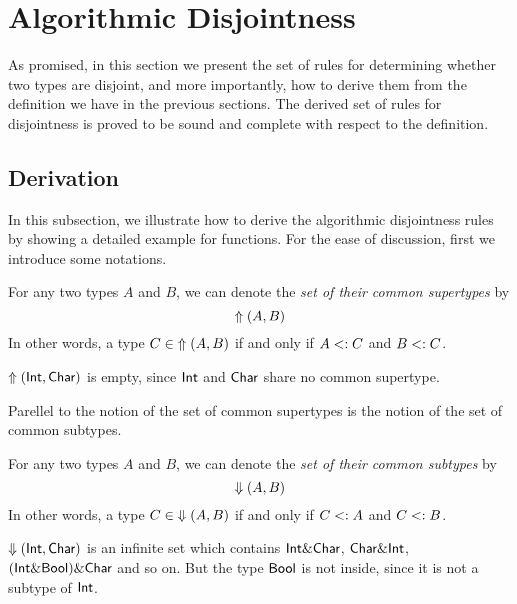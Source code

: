 \section{Algorithmic Disjointness}

As promised, in this section we present the set of rules for determining whether
two types are disjoint, and more importantly, how to derive them from the
definition we have in the previous sections. The derived set of rules for
disjointness is proved to be sound and complete with respect to the definition.

\subsection{Derivation}

In this subsection, we illustrate how to derive the algorithmic disjointness
rules by showing a detailed example for functions. For the ease of discussion,
first we introduce some notations.

\begin{definition}
  For any two types $A$ and $B$, we can denote the \emph{set of their common
  supertypes} by \[ \Uparrow(A,B) \] In other words, a type $C \in \;
  \Uparrow(A,B)$ if and only  if $A <: C$ and $B <: C$.
\end{definition}

\begin{example}
  $\Uparrow(\textsf{Int},\textsf{Char})$ is empty, since $\textsf{Int}$ and $\textsf{Char}$
  share no common supertype.
\end{example}

Parellel to the notion of the set of common supertypes is the notion of the set
of common subtypes.

\begin{definition}
  For any two types $A$ and $B$, we can denote the \emph{set of their common
  subtypes} by \[ \Downarrow(A,B) \] In other words, a type $C \in \; \Downarrow(A,B)$
  if and only  if $C <: A$ and $C <: B$.
\end{definition}

\begin{example}
  $\Downarrow(\textsf{Int},\textsf{Char})$ is an infinite set which contains $\textsf{Int} \&
  \textsf{Char}$, $\textsf{Char} \& \textsf{Int}$, $(\textsf{Int} \& \textsf{Bool}) \& \textsf{Char}$
  and so on. But the type $\textsf{Bool}$ is not inside, since it is not a subtype of
  $\textsf{Int}$.
\end{example}

